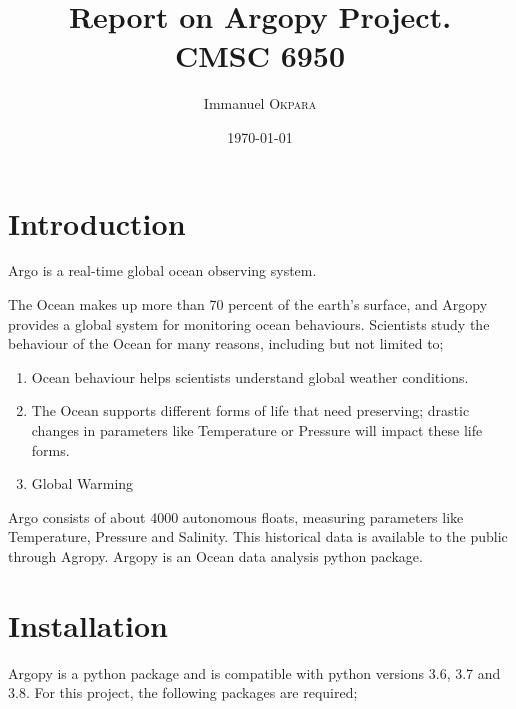 \documentclass{article}
\title{Report on Argopy Project. \\ CMSC 6950} %
\author{Immanuel \textsc{Okpara}} %
\date{\today} %
\begin{document}
\maketitle %



\section{Introduction}

Argo is a real-time global ocean observing system.

The Ocean makes up more than 70 percent of the earth's surface, and Argopy provides a global system for monitoring ocean behaviours.
Scientists study the behaviour of the Ocean for many reasons, including but not limited to;
\begin{enumerate}
    \item Ocean behaviour helps scientists understand global weather conditions.
    \item The Ocean supports different forms of life that need preserving; drastic changes in parameters like Temperature or Pressure will impact these life forms. 
    \item Global Warming
    \end{enumerate}
Argo consists of about 4000 autonomous floats, measuring parameters like Temperature, Pressure and Salinity. This historical data is available to the public through Agropy.
Argopy is an Ocean data analysis python package.\\


\section{Installation}
Argopy is a python package and is compatible with python versions 3.6, 3.7 and 3.8. 
For this project, the following packages are required;
\end{document}
